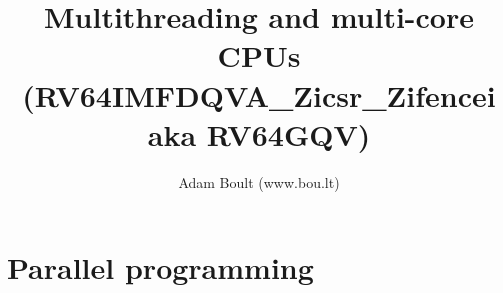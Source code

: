 \documentclass[oneside]{book}
\begin{document}
\author{Adam Boult (www.bou.lt)}
\title{Multithreading and multi-core CPUs (RV64IMFDQVA\_Zicsr\_Zifencei aka RV64GQV)}
\maketitle

\setcounter{tocdepth}{0}
\tableofcontents



\part{Parallel programming}

\end{document}
